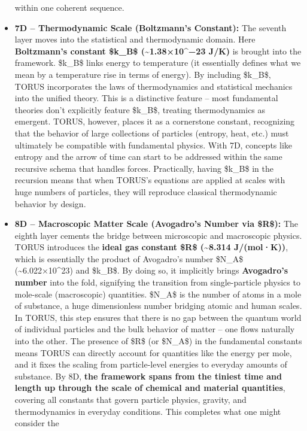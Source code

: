 \begin{itemize}
  within one coherent sequence.
\item
  \textbf{7D -- Thermodynamic Scale (Boltzmann's Constant):} The seventh
  layer moves into the statistical and thermodynamic domain. Here
  \textbf{Boltzmann's constant \$k\_B\$ (\textasciitilde{}1.38×10\^{}−23
  J/K)} is brought into the framework. \$k\_B\$ links energy to
  temperature (it essentially defines what we mean by a temperature rise
  in terms of energy). By including \$k\_B\$, TORUS incorporates the
  laws of thermodynamics and statistical mechanics into the unified
  theory. This is a distinctive feature -- most fundamental theories
  don't explicitly feature \$k\_B\$, treating thermodynamics as
  emergent. TORUS, however, places it as a cornerstone constant,
  recognizing that the behavior of large collections of particles
  (entropy, heat, etc.) must ultimately be compatible with fundamental
  physics. With 7D, concepts like entropy and the arrow of time can
  start to be addressed within the same recursive schema that handles
  forces. Practically, having \$k\_B\$ in the recursion means that when
  TORUS's equations are applied at scales with huge numbers of
  particles, they will reproduce classical thermodynamic behavior by
  design.
\item
  \textbf{8D -- Macroscopic Matter Scale (Avogadro's Number via \$R\$):}
  The eighth layer cements the bridge between microscopic and
  macroscopic physics. TORUS introduces the \textbf{ideal gas constant
  \$R\$ (\textasciitilde{}8.314 J/(mol·K))}, which is essentially the
  product of Avogadro's number \$N\_A\$
  (\textasciitilde{}6.022×10\^{}23) and \$k\_B\$​. By doing so, it
  implicitly brings \textbf{Avogadro's number} into the fold, signifying
  the transition from single-particle physics to mole-scale
  (macroscopic) quantities. \$N\_A\$ is the number of atoms in a mole of
  substance, a huge dimensionless number bridging atomic and human
  scales. In TORUS, this step ensures that there is no gap between the
  quantum world of individual particles and the bulk behavior of matter
  -- one flows naturally into the other. The presence of \$R\$ (or
  \$N\_A\$) in the fundamental constants means TORUS can directly
  account for quantities like the energy per mole, and it fixes the
  scaling from particle-level energies to everyday amounts of substance.
  By 8D, \textbf{the framework spans from the tiniest time and length up
  through the scale of chemical and material quantities}, covering all
  constants that govern particle physics, gravity, and thermodynamics in
  everyday conditions. This completes what one might consider the

\end{itemize}
